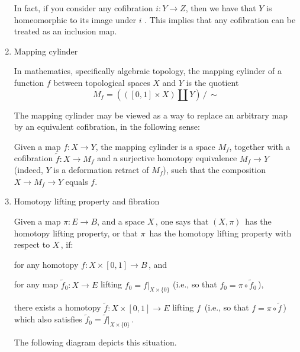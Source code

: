 \documentclass{ctexart}
\begin{document}
\begin{enumerate}
In fact, if you consider any cofibration $i:Y\to Z$, then we have that $Y$ is homeomorphic to its image under $\mathbf{\mathit {i}}$ . This implies that any cofibration can be treated as an inclusion map.

\item Mapping cylinder

In mathematics, specifically algebraic topology, the mapping cylinder of a function $f$ between topological spaces $X$ and $Y$ is the quotient
\[
M_{f}=(([0,1]\times X)\amalg Y)\,/\,\sim
\]

The mapping cylinder may be viewed as a way to replace an arbitrary map by an equivalent cofibration, in the following sense:

Given a map $f\colon X\to Y$, the mapping cylinder is a space $M_{f}$, together with a cofibration $\tilde f\colon X \to M_f$ and a surjective homotopy equivalence $M_f \to Y$ (indeed, $Y$ is a deformation retract of $M_{f}$), such that the composition $X \to M_f \to Y$ equals $f$.
\begin{center}
\end{center}

\item Homotopy lifting property and fibration

Given a map $\pi \colon E\to B$, and a space $X\,$, one says that $(X,\pi )\,$ has the homotopy lifting property, or that $\pi \,$ has the homotopy lifting property with respect to $X\,$, if:

    for any homotopy $f\colon X\times [0,1]\to B\,$, and

    for any map ${\tilde {f}}_{0}\colon X\to E$ lifting $f_{0}=f|_{X\times \{0\}}$ (i.e., so that $f_{0}=\pi \circ {\tilde {f}}_{0}\,$),

there exists a homotopy ${\tilde {f}}\colon X\times [0,1]\to E$ lifting $f\,$ (i.e., so that $f=\pi \circ {\tilde {f}}\,$) which also satisfies ${\tilde {f}}_{0}={\tilde {f}}|_{X\times \{0\}}\,$.

The following diagram depicts this situation.

\begin{center}
\end{center}



\end{enumerate}
\end{document}

